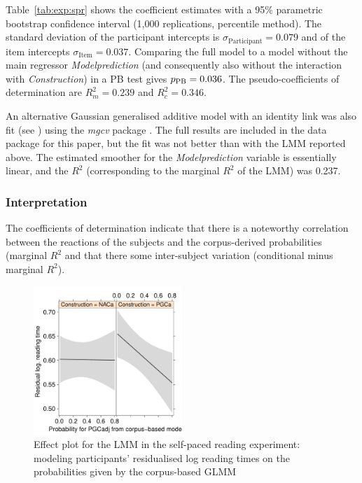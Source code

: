 Table~\ref{tab:exp:spr} shows the coefficient estimates with a 95\% parametric bootstrap confidence interval (1,000 replications, percentile method).
The standard deviation of the participant intercepts is $\sigma_{\text{Participant}}=0.079$ and of the item intercepts $\sigma_{\text{Item}}=0.037$.
Comparing the full model to a model without the main regressor \textit{Modelprediction} (and consequently also without the interaction with \textit{Construction}) in a PB test gives $p_{\text{PB}}=0.036$.
The pseudo-coefficients of determination are $R^2_m=0.239$ and $R^2_c=0.346$.

An alternative Gaussian generalised additive model with an identity link was also fit (see \citealp{DivjakEa2016}) using the \textit{mgcv} package \citep{Wood2011}.
The full results are included in the data package for this paper, but the fit was not better than with the LMM reported above.
The estimated smoother for the \textit{Modelprediction} variable is essentially linear, and the $R^2$ (corresponding to the marginal $R^2$ of the LMM) was 0.237.

\subsubsection{Interpretation}

The coefficients of determination indicate that there is a noteworthy correlation between the reactions of the subjects and the corpus-derived probabilities (marginal $R^2$ and that there some inter-subject variation (conditional minus marginal $R^2$).

\begin{figure}[htbp!]
\centering
\includegraphics[width=0.5\textwidth]{../R/output/spr_effects}
\caption{Effect plot for the LMM in the self-paced reading experiment: modeling participants' residualised log reading times on the probabilities given by the corpus-based GLMM}
\label{fig:spr:effects}
\end{figure}

